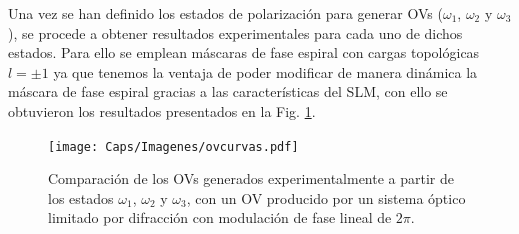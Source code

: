 
Una vez se han definido los estados de polarización para generar OVs ($\omega_1$, $\omega_2$ y $\omega_3$), se procede a obtener resultados experimentales para cada uno de dichos estados. Para ello se emplean máscaras de fase espiral con cargas topológicas $l=\pm 1$ ya que tenemos la ventaja de poder modificar de manera dinámica la máscara de fase espiral gracias a las características del SLM, con ello se obtuvieron los resultados presentados en la Fig. \ref{fig:curvaovs}.

\begin{figure}[!ht]
  \centering
    \texttt{[image: Caps/Imagenes/ovcurvas.pdf]}
  \caption[Comparación de los OVs generados experimentalmente a partir de los estados $\omega_1$, $\omega_2$ y $\omega_3$.]{Comparación de los OVs generados experimentalmente a partir de los estados $\omega_1$, $\omega_2$ y $\omega_3$, con un OV producido por un sistema óptico limitado por difracción con modulación de fase lineal de $2\pi$.}
  \label{fig:curvaovs}
\end{figure}

